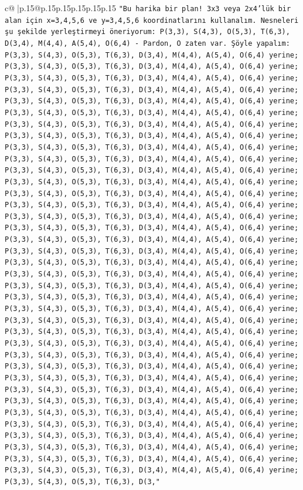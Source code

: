 \documentclass{article}
\begin{document}
{\begin{supertabular}{c@{$\;$}|p{.15\linewidth}@{}p{.15\linewidth}p{.15\linewidth}p{.15\linewidth}p{.15\linewidth}p{.15\linewidth}}
{{{\texttt{"Bu harika bir plan! 3x3 veya 2x4'lük bir alan için x=3,4,5,6 ve y=3,4,5,6 koordinatlarını kullanalım. Nesneleri şu şekilde yerleştirmeyi öneriyorum: P(3,3), S(4,3), O(5,3), T(6,3), D(3,4), M(4,4), A(5,4), O(6,4) {-} Pardon, O zaten var. Şöyle yapalım: P(3,3), S(4,3), O(5,3), T(6,3), D(3,4), M(4,4), A(5,4), O(6,4) yerine; P(3,3), S(4,3), O(5,3), T(6,3), D(3,4), M(4,4), A(5,4), O(6,4) yerine; P(3,3), S(4,3), O(5,3), T(6,3), D(3,4), M(4,4), A(5,4), O(6,4) yerine; P(3,3), S(4,3), O(5,3), T(6,3), D(3,4), M(4,4), A(5,4), O(6,4) yerine; P(3,3), S(4,3), O(5,3), T(6,3), D(3,4), M(4,4), A(5,4), O(6,4) yerine; P(3,3), S(4,3), O(5,3), T(6,3), D(3,4), M(4,4), A(5,4), O(6,4) yerine; P(3,3), S(4,3), O(5,3), T(6,3), D(3,4), M(4,4), A(5,4), O(6,4) yerine; P(3,3), S(4,3), O(5,3), T(6,3), D(3,4), M(4,4), A(5,4), O(6,4) yerine; P(3,3), S(4,3), O(5,3), T(6,3), D(3,4), M(4,4), A(5,4), O(6,4) yerine; P(3,3), S(4,3), O(5,3), T(6,3), D(3,4), M(4,4), A(5,4), O(6,4) yerine; P(3,3), S(4,3), O(5,3), T(6,3), D(3,4), M(4,4), A(5,4), O(6,4) yerine; P(3,3), S(4,3), O(5,3), T(6,3), D(3,4), M(4,4), A(5,4), O(6,4) yerine; P(3,3), S(4,3), O(5,3), T(6,3), D(3,4), M(4,4), A(5,4), O(6,4) yerine; P(3,3), S(4,3), O(5,3), T(6,3), D(3,4), M(4,4), A(5,4), O(6,4) yerine; P(3,3), S(4,3), O(5,3), T(6,3), D(3,4), M(4,4), A(5,4), O(6,4) yerine; P(3,3), S(4,3), O(5,3), T(6,3), D(3,4), M(4,4), A(5,4), O(6,4) yerine; P(3,3), S(4,3), O(5,3), T(6,3), D(3,4), M(4,4), A(5,4), O(6,4) yerine; P(3,3), S(4,3), O(5,3), T(6,3), D(3,4), M(4,4), A(5,4), O(6,4) yerine; P(3,3), S(4,3), O(5,3), T(6,3), D(3,4), M(4,4), A(5,4), O(6,4) yerine; P(3,3), S(4,3), O(5,3), T(6,3), D(3,4), M(4,4), A(5,4), O(6,4) yerine; P(3,3), S(4,3), O(5,3), T(6,3), D(3,4), M(4,4), A(5,4), O(6,4) yerine; P(3,3), S(4,3), O(5,3), T(6,3), D(3,4), M(4,4), A(5,4), O(6,4) yerine; P(3,3), S(4,3), O(5,3), T(6,3), D(3,4), M(4,4), A(5,4), O(6,4) yerine; P(3,3), S(4,3), O(5,3), T(6,3), D(3,4), M(4,4), A(5,4), O(6,4) yerine; P(3,3), S(4,3), O(5,3), T(6,3), D(3,4), M(4,4), A(5,4), O(6,4) yerine; P(3,3), S(4,3), O(5,3), T(6,3), D(3,4), M(4,4), A(5,4), O(6,4) yerine; P(3,3), S(4,3), O(5,3), T(6,3), D(3,4), M(4,4), A(5,4), O(6,4) yerine; P(3,3), S(4,3), O(5,3), T(6,3), D(3,4), M(4,4), A(5,4), O(6,4) yerine; P(3,3), S(4,3), O(5,3), T(6,3), D(3,4), M(4,4), A(5,4), O(6,4) yerine; P(3,3), S(4,3), O(5,3), T(6,3), D(3,4), M(4,4), A(5,4), O(6,4) yerine; P(3,3), S(4,3), O(5,3), T(6,3), D(3,4), M(4,4), A(5,4), O(6,4) yerine; P(3,3), S(4,3), O(5,3), T(6,3), D(3,4), M(4,4), A(5,4), O(6,4) yerine; P(3,3), S(4,3), O(5,3), T(6,3), D(3,4), M(4,4), A(5,4), O(6,4) yerine; P(3,3), S(4,3), O(5,3), T(6,3), D(3,4), M(4,4), A(5,4), O(6,4) yerine; P(3,3), S(4,3), O(5,3), T(6,3), D(3,4), M(4,4), A(5,4), O(6,4) yerine; P(3,3), S(4,3), O(5,3), T(6,3), D(3,4), M(4,4), A(5,4), O(6,4) yerine; P(3,3), S(4,3), O(5,3), T(6,3), D(3,4), M(4,4), A(5,4), O(6,4) yerine; P(3,3), S(4,3), O(5,3), T(6,3), D(3,"} \\
}}}
\end{supertabular}}
\end{document}
